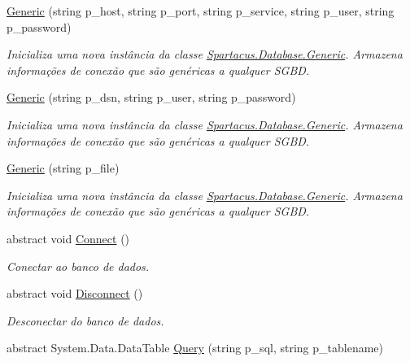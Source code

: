 \begin{DoxyCompactItemize}
\item 
\hyperlink{classSpartacus_1_1Database_1_1Generic_a622b197eddc5c95c47c848a5820addca}{Generic} (string p\+\_\+host, string p\+\_\+port, string p\+\_\+service, string p\+\_\+user, string p\+\_\+password)
\begin{DoxyCompactList}\small\item\em Inicializa uma nova instância da classe \hyperlink{classSpartacus_1_1Database_1_1Generic}{Spartacus.\+Database.\+Generic}. Armazena informações de conexão que são genéricas a qualquer S\+G\+B\+D. \end{DoxyCompactList}\item 
\hyperlink{classSpartacus_1_1Database_1_1Generic_ae767e531163e6d35c9da13bf1a26da5b}{Generic} (string p\+\_\+dsn, string p\+\_\+user, string p\+\_\+password)
\begin{DoxyCompactList}\small\item\em Inicializa uma nova instância da classe \hyperlink{classSpartacus_1_1Database_1_1Generic}{Spartacus.\+Database.\+Generic}. Armazena informações de conexão que são genéricas a qualquer S\+G\+B\+D. \end{DoxyCompactList}\item 
\hyperlink{classSpartacus_1_1Database_1_1Generic_a135fa36ed3379d3e7360a44935d3507e}{Generic} (string p\+\_\+file)
\begin{DoxyCompactList}\small\item\em Inicializa uma nova instância da classe \hyperlink{classSpartacus_1_1Database_1_1Generic}{Spartacus.\+Database.\+Generic}. Armazena informações de conexão que são genéricas a qualquer S\+G\+B\+D. \end{DoxyCompactList}\item 
abstract void \hyperlink{classSpartacus_1_1Database_1_1Generic_a0f3940aeabde41676f15366e83eff166}{Connect} ()
\begin{DoxyCompactList}\small\item\em Conectar ao banco de dados. \end{DoxyCompactList}\item 
abstract void \hyperlink{classSpartacus_1_1Database_1_1Generic_a765dda5d5d8a768885fabd9799a0a180}{Disconnect} ()
\begin{DoxyCompactList}\small\item\em Desconectar do banco de dados. \end{DoxyCompactList}\item 
abstract System.\+Data.\+Data\+Table \hyperlink{classSpartacus_1_1Database_1_1Generic_a23dc0eb8f4722d1adb1935044bc878ff}{Query} (string p\+\_\+sql, string p\+\_\+tablename)

\end{DoxyCompactItemize}
